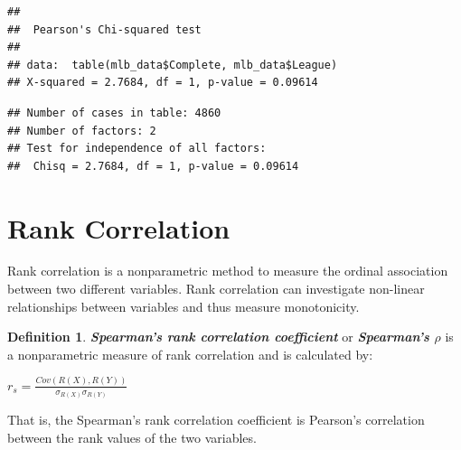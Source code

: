 \documentclass[
  11pt,
]{book}
\newenvironment{Shaded}{\begin{snugshade}}{\end{snugshade}}
\newcommand{\AttributeTok}[1]{\textcolor[rgb]{0.77,0.63,0.00}{#1}}
\newcommand{\FunctionTok}[1]{\textcolor[rgb]{0.00,0.00,0.00}{#1}}
\newcommand{\NormalTok}[1]{#1}
\newcommand{\SpecialCharTok}[1]{\textcolor[rgb]{0.00,0.00,0.00}{#1}}
\theoremstyle{definition}
\newtheorem{definition}{Definition}[chapter]
\theoremstyle{definition}
\theoremstyle{definition}
\theoremstyle{definition}
\theoremstyle{remark}
\begin{document}
\begin{Shaded}
\end{Shaded}

\begin{verbatim}
## 
##  Pearson's Chi-squared test
## 
## data:  table(mlb_data$Complete, mlb_data$League)
## X-squared = 2.7684, df = 1, p-value = 0.09614
\end{verbatim}

\begin{Shaded}
\end{Shaded}

\begin{verbatim}
## Number of cases in table: 4860 
## Number of factors: 2 
## Test for independence of all factors:
##  Chisq = 2.7684, df = 1, p-value = 0.09614
\end{verbatim}

\newpage

\hypertarget{rank-correlation}{%
\section{Rank Correlation}\label{rank-correlation}}

Rank correlation is a nonparametric method to measure the ordinal association between two different variables. Rank correlation can investigate non-linear relationships between variables and thus measure monotonicity.

\begin{definition}
\textbf{\emph{Spearman's rank correlation coefficient}} or \textbf{\emph{Spearman's \(\rho\)}} is a nonparametric measure of rank correlation and is calculated by:

\(r_s = \frac{Cov(R(X),R(Y))}{\sigma_{R(X)}\sigma_{R(Y)}}\)

That is, the Spearman's rank correlation coefficient is Pearson's correlation between the rank values of the two variables.
\end{definition}
\end{document}
